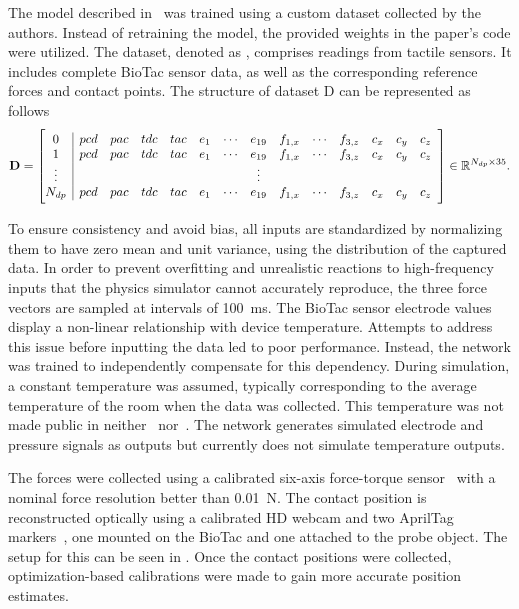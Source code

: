 The model described in~ was trained using a custom dataset collected by the authors. Instead of retraining the model, the provided weights in the paper's code were utilized. The dataset, denoted as , comprises  readings from tactile sensors. It includes complete BioTac sensor data, as well as the corresponding reference forces and contact points. The structure of dataset D can be represented as follows
%
\begin{equation} \label{eq:dl-data-matrix}
	\mat{D} =
	\left[\begin{array}{@{}c|cccccccccccccc@{}}
		0       & pcd & pac & tdc & tac & e_{1} & \cdots & e_{19} & f_{1,x} & \cdots & f_{3,z} & c_x & c_y & c_z \\
		1       & pcd & pac & tdc & tac & e_{1} & \cdots & e_{19} & f_{1,x} & \cdots & f_{3,z} & c_x & c_y & c_z \\
		\vdots  &  &  &  &  &  &  & \vdots &  &  &  &  &  &  \\
		N_{dp}  & pcd & pac & tdc & tac & e_{1} & \cdots & e_{19} & f_{1,x} & \cdots & f_{3,z} & c_x & c_y & c_z
		\end{array}\right] \inR{N_{dp} \times 35}.
\end{equation}

To ensure consistency and avoid bias, all inputs are standardized by normalizing them to have zero mean and unit variance, using the distribution of the captured data. In order to prevent overfitting and unrealistic reactions to high-frequency inputs that the physics simulator cannot accurately reproduce, the three force vectors are sampled at intervals of \SI{100}{\milli\second}. The BioTac sensor electrode values display a non-linear relationship with device temperature. Attempts to address this issue before inputting the data led to poor performance. Instead, the network was trained to independently compensate for this dependency. During simulation, a constant temperature was assumed, typically corresponding to the average temperature of the room when the data was collected. This temperature was not made public in neither~\cite{biotac-dataset} nor~\cite{simulation-of-the-syntouch-biotac-sensor}. The network generates simulated electrode and pressure signals as outputs but currently does not simulate temperature outputs.\medskip

The forces were collected using a calibrated six-axis force-torque sensor~\cite{ati:-6-axis-force-and-torque-sensor-nano17-series} with a nominal force resolution better than \SI{0.01}{\newton}. The contact position is reconstructed optically using a calibrated HD webcam and two AprilTag markers~\cite{apriltag:-a-robust-and-flexible-visual-fiducial-system}, one mounted on the BioTac and one attached to the probe object. The setup for this can be seen in . Once the contact positions were collected, optimization-based calibrations were made to gain more accurate position estimates. \medskip

